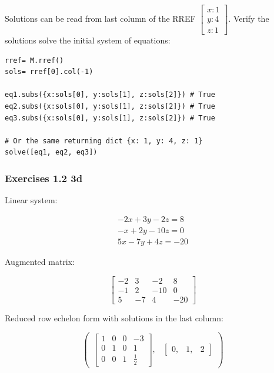 Solutions can be read from last column of the RREF $\left[\begin{matrix}x:1\\y:4\\z:1\end{matrix}\right]$. Verify the solutions solve
the initial system of equations:

\begin{verbatim}
rref= M.rref()
sols= rref[0].col(-1)

eq1.subs({x:sols[0], y:sols[1], z:sols[2]}) # True
eq2.subs({x:sols[0], y:sols[1], z:sols[2]}) # True
eq3.subs({x:sols[0], y:sols[1], z:sols[2]}) # True

# Or the same returning dict {x: 1, y: 4, z: 1}
solve([eq1, eq2, eq3]) 
\end{verbatim}

\subsubsection{Exercises 1.2 3d}

Linear system:

\begin{equation}
\begin{matrix}
    - 2 x + 3 y - 2 z = 8 \\
    - x + 2 y - 10 z = 0 \\
    5 x - 7 y + 4 z = -20
\end{matrix}
\end{equation}

Augmented matrix:

\begin{equation}
\left[\begin{matrix}-2 & 3 & -2 & 8\\-1 & 2 & -10 & 0\\5 & -7 & 4 & -20\end{matrix}\right]
\end{equation}

Reduced row echelon form with solutions in the last column:

\begin{equation}
\begin{pmatrix}\left[\begin{matrix}1 & 0 & 0 & -3 \\
                                   0 & 1 & 0 & 1 \\
                                   0 & 0 & 1 &
\frac{1}{2}\end{matrix}\right], & \begin{bmatrix}0, & 1, & 2\end{bmatrix}\end{pmatrix}
\end{equation}

